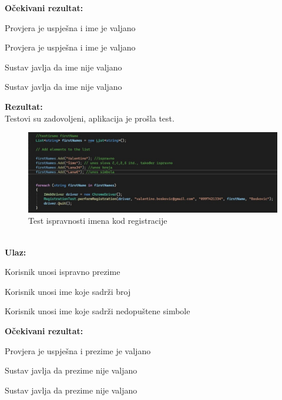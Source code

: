 			\noindent \textbf{Očekivani rezultat:}
			
			\begin{packed_enum}
				\item Provjera je uspješna i ime je valjano
				\item Provjera je uspješna i ime je valjano
				\item Sustav javlja da ime nije valjano
				\item Sustav javlja da ime nije valjano
				
			\end{packed_enum}
			
			\noindent \textbf{Rezultat:}\\
			Testovi su zadovoljeni, aplikacija je prošla test.\\
			\begin{figure}[H]
				\includegraphics[width=\textwidth]{1test_1_ime.JPEG}
				\centering
				\caption{Test ispravnosti imena kod registracije}
				\label{fig:testime}
			\end{figure}
			
			\noindent {}\\
			\textbf{Ulaz: }	
			\begin{packed_enum}
				\item Korisnik unosi ispravno prezime
				\item Korisnik unosi ime koje sadrži broj
				\item Korisnik unosi ime koje sadrži nedopuštene simbole
				
			\end{packed_enum}
			
			\noindent \textbf{Očekivani rezultat:}
			
			\begin{packed_enum}
				\item Provjera je uspješna i prezime je valjano
				\item Sustav javlja da prezime nije valjano
				\item Sustav javlja da prezime nije valjano
				
			\end{packed_enum}
			
